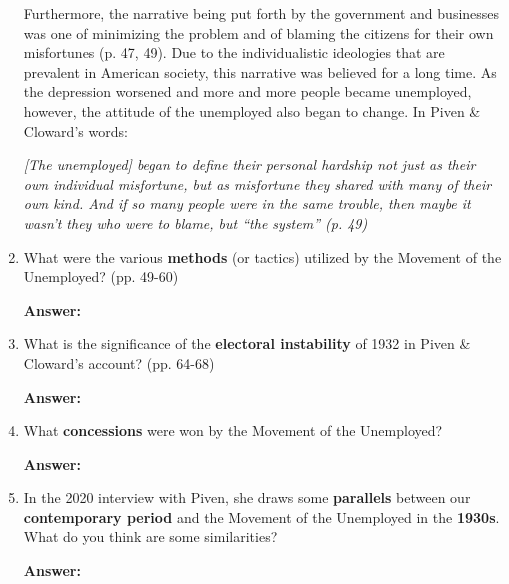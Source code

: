 \documentclass{article}
\newcommand{\answer}{\textbf{Answer:}$\;$}
\begin{document}
\begin{enumerate}[label=\arabic*)]
    Furthermore, the narrative being put forth by the government and businesses was one of minimizing the problem and of blaming the citizens for their own misfortunes (p. 47, 49).
    Due to the individualistic ideologies that are prevalent in American society, this narrative was believed for a long time.
    As the depression worsened and more and more people became unemployed, however, the attitude of the unemployed also began to change.
    In Piven \& Cloward's words:
    \begin{center}
        \textit{[The unemployed] began to define their personal hardship not just as their own individual misfortune, but as misfortune they shared with many of their own kind.
        And if so many people were in the same trouble, then maybe it wasn't they who were to blame, but ``the system'' (p. 49)}
    \end{center}

    \item What were the various \textbf{methods} (or tactics) utilized by the Movement of the Unemployed? (pp. 49-60)

    \answer

    \item What is the significance of the \textbf{electoral instability} of 1932 in Piven \& Cloward's account? (pp. 64-68)

    \answer

    \item What \textbf{concessions} were won by the Movement of the Unemployed?

    \answer

    \item In the 2020 interview with Piven, she draws some \textbf{parallels} between our \textbf{contemporary period} and the Movement of the Unemployed in the \textbf{1930s}.
    What do you think are some similarities?

    \answer
    
\end{enumerate}
 
\end{document}
